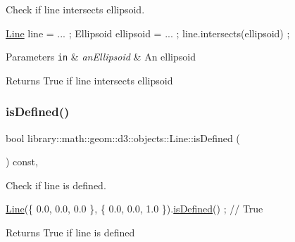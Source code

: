 Check if line intersects ellipsoid. 


\begin{DoxyCode}
\hyperlink{classlibrary_1_1math_1_1geom_1_1d3_1_1objects_1_1_line_a762e529453ff9ffa9233fd73737f4692}{Line} line = ... ;
Ellipsoid ellipsoid = ... ;
line.intersects(ellipsoid) ;
\end{DoxyCode}



\begin{DoxyParams}[1]{Parameters}
\mbox{\tt in}  & {\em an\+Ellipsoid} & An ellipsoid \\
\hline
\end{DoxyParams}
\begin{DoxyReturn}{Returns}
True if line intersects ellipsoid 
\end{DoxyReturn}
\mbox{\label{classlibrary_1_1math_1_1geom_1_1d3_1_1objects_1_1_line_ab7b509259a32ac21c83bb14fcc7f83f3}} 
\subsubsection{\texorpdfstring{is\+Defined()}{isDefined()}}
{\footnotesize\ttfamily bool library\+::math\+::geom\+::d3\+::objects\+::\+Line\+::is\+Defined (\begin{DoxyParamCaption}{ }\end{DoxyParamCaption}) const\hspace{0.3cm}{\ttfamily [override]}, {\ttfamily [virtual]}}



Check if line is defined. 


\begin{DoxyCode}
\hyperlink{classlibrary_1_1math_1_1geom_1_1d3_1_1objects_1_1_line_a762e529453ff9ffa9233fd73737f4692}{Line}(\{ 0.0, 0.0, 0.0 \}, \{ 0.0, 0.0, 1.0 \}).\hyperlink{classlibrary_1_1math_1_1geom_1_1d3_1_1objects_1_1_line_ab7b509259a32ac21c83bb14fcc7f83f3}{isDefined}() ; \textcolor{comment}{// True}
\end{DoxyCode}


\begin{DoxyReturn}{Returns}
True if line is defined 
\end{DoxyReturn}


